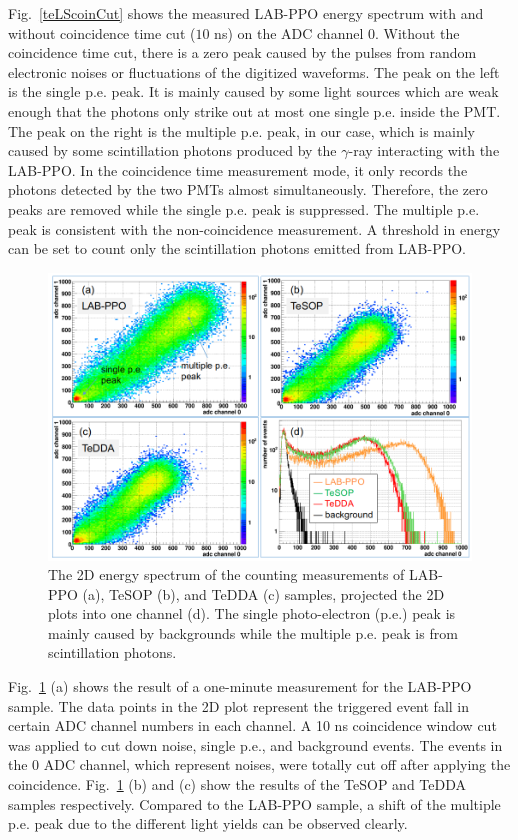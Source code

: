 Fig.~\ref{teLScoinCut} shows the measured LAB-PPO energy spectrum with and without coincidence time cut ($10$ ns) on the ADC channel 0.  Without the coincidence time cut, there is a zero peak caused by the pulses from random electronic noises or fluctuations of the digitized waveforms. The peak on the left is the single p.e. peak. It is mainly caused by some light sources which are weak enough that the photons only strike out at most one single p.e. inside the PMT\cite{leo2012techniques}. The peak on the right is the multiple p.e. peak, in our case, which is mainly caused by some scintillation photons produced by the $\gamma$-ray interacting with the LAB-PPO. In the coincidence time measurement mode, it only records the photons detected by the two PMTs almost simultaneously. Therefore, the zero peaks are removed while the single p.e. peak is suppressed. The multiple p.e. peak is consistent with the non-coincidence measurement. A threshold in energy can be set to count only the scintillation photons emitted from LAB-PPO. 

\begin{figure}[htbp]
	\centering	
	\includegraphics[width=14cm]{TeLS_2Denergy.png}
	\caption[The 2D energy spectrum of the counting measurements.]{The 2D energy spectrum of the counting measurements of LAB-PPO (a), TeSOP (b), and TeDDA (c) samples, projected the 2D plots into one channel (d). The single photo-electron (p.e.) peak is mainly caused by backgrounds while the multiple p.e. peak is from scintillation photons.}
	\label{teLSresults}
\end{figure}

Fig.~\ref{teLSresults} (a) shows the result of a one-minute measurement for the LAB-PPO sample. The data points in the 2D plot represent the triggered event fall in certain ADC channel numbers in each channel. A 10 ns coincidence window cut was applied to cut down noise, single p.e., and background events. The events in the 0 ADC channel, which represent noises, were totally cut off after applying the coincidence. Fig.~\ref{teLSresults} (b) and (c) show the results of the TeSOP and TeDDA samples respectively. Compared to the LAB-PPO sample, a shift of the multiple p.e. peak due to the different light yields can be observed clearly.

